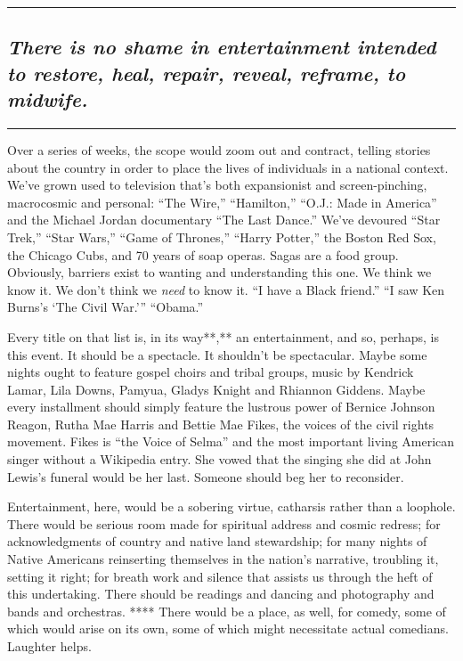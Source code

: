 \begin{center}\rule{0.5\linewidth}{\linethickness}\end{center}

\hypertarget{there-is-no-shame-in-entertainment-intended-to-restore-heal-repair-reveal-reframe-to-midwife}{%
\subsection{\texorpdfstring{\emph{There is no shame in entertainment
intended to restore, heal, repair, reveal, reframe, to
midwife.}}{There is no shame in entertainment intended to restore, heal, repair, reveal, reframe, to midwife.}}\label{there-is-no-shame-in-entertainment-intended-to-restore-heal-repair-reveal-reframe-to-midwife}}

\begin{center}\rule{0.5\linewidth}{\linethickness}\end{center}

Over a series of weeks, the scope would zoom out and contract, telling
stories about the country in order to place the lives of individuals in
a national context. We've grown used to television that's both
expansionist and screen-pinching, macrocosmic and personal: ``The
Wire,'' ``Hamilton,'' ``O.J.: Made in America'' and the Michael Jordan
documentary ``The Last Dance.'' We've devoured ``Star Trek,'' ``Star
Wars,'' ``Game of Thrones,'' ``Harry Potter,'' the Boston Red Sox, the
Chicago Cubs, and 70 years of soap operas. Sagas are a food group.
Obviously, barriers exist to wanting and understanding this one. We
think we know it. We don't think we \emph{need} to know it. ``I have a
Black friend.'' ``I saw Ken Burns's `The Civil War.''' ``Obama.''

Every title on that list is, in its way**,** an entertainment, and so,
perhaps, is this event. It should be a spectacle. It shouldn't be
spectacular. Maybe some nights ought to feature gospel choirs and tribal
groups, music by Kendrick Lamar, Lila Downs, Pamyua, Gladys Knight and
Rhiannon Giddens. Maybe every installment should simply feature the
lustrous power of Bernice Johnson Reagon, Rutha Mae Harris and Bettie
Mae Fikes, the voices of the civil rights movement. Fikes is ``the Voice
of Selma'' and the most important living American singer without a
Wikipedia entry. She vowed that the singing she did at John Lewis's
funeral would be her last. Someone should beg her to reconsider.

Entertainment, here, would be a sobering virtue, catharsis rather than a
loophole. There would be serious room made for spiritual address and
cosmic redress; for acknowledgments of country and native land
stewardship; for many nights of Native Americans reinserting themselves
in the nation's narrative, troubling it, setting it right; for breath
work and silence that assists us through the heft of this undertaking.
There should be readings and dancing and photography and bands and
orchestras. **** There would be a place, as well, for comedy, some of
which would arise on its own, some of which might necessitate actual
comedians. Laughter helps.

